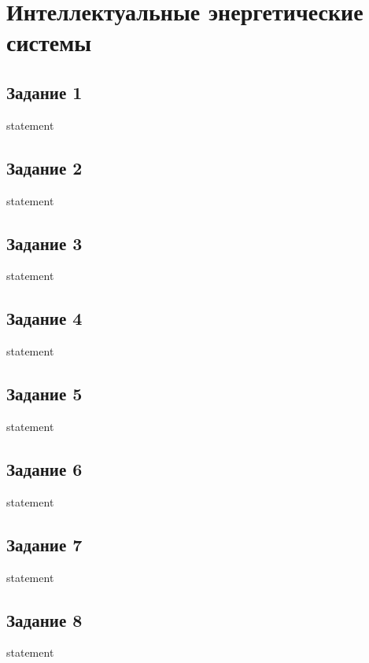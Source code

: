 \chapter{Интеллектуальные энергетические системы}

%
\section{Задание 1}

{statement}

\section{Задание 2}

{statement}

\section{Задание 3}

{statement}

\section{Задание 4}

{statement}

\section{Задание 5}

{statement}

\section{Задание 6}

{statement}

\section{Задание 7}

{statement}

\section{Задание 8}

{statement}